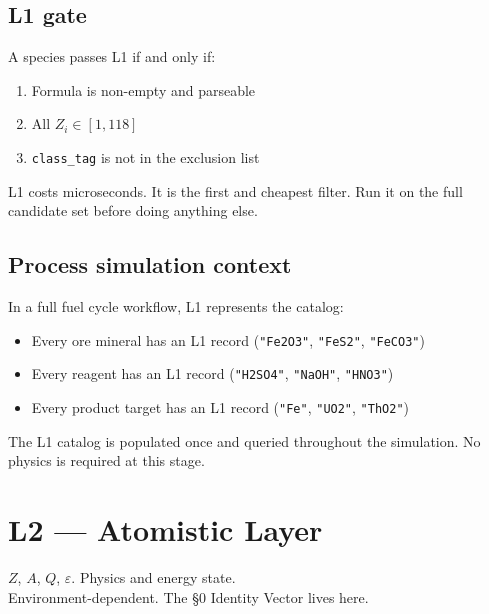 \documentclass[11pt, a4paper, oneside]{article}
\theoremstyle{definition}
\begin{document}
\subsection{L1 gate}

A species passes L1 if and only if:
\begin{enumerate}
  \item Formula is non-empty and parseable
  \item All $Z_i \in [1, 118]$
  \item \texttt{class\_tag} is not in the exclusion list
\end{enumerate}

L1 costs microseconds.  It is the first and cheapest filter.  Run it on
the full candidate set before doing anything else.

\subsection{Process simulation context}

In a full fuel cycle workflow, L1 represents the catalog:
\begin{itemize}
  \item Every ore mineral has an L1 record (\texttt{"Fe2O3"},
        \texttt{"FeS2"}, \texttt{"FeCO3"})
  \item Every reagent has an L1 record (\texttt{"H2SO4"},
        \texttt{"NaOH"}, \texttt{"HNO3"})
  \item Every product target has an L1 record (\texttt{"Fe"},
        \texttt{"UO2"}, \texttt{"ThO2"})
\end{itemize}

The L1 catalog is populated once and queried throughout the simulation.
No physics is required at this stage.

\section{L2 — Atomistic Layer}
\label{sec:l2}

\begin{tcolorbox}[colback=l2col, colframe=orange!60!black,
  title={L2 — Atomistic},fonttitle=\bfseries\small]
  $Z$, $A$, $Q$, $\varepsilon$.  Physics and energy state.\\
  Environment-dependent.  The §0 Identity Vector lives here.
\end{tcolorbox}
\end{document}
